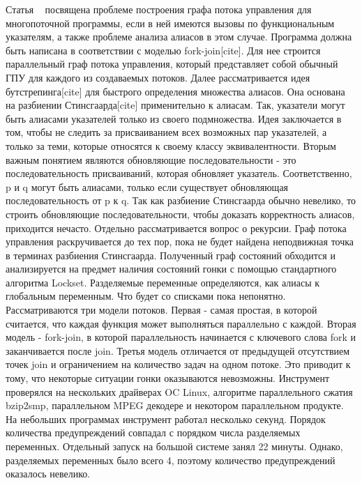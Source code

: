Статья ~\cite{Kahlon:2009:SDR} посвящена проблеме построения графа потока управления для многопоточной программы, если в ней имеются вызовы по функциональным указателям, а также проблеме анализа алиасов в этом случае. Программа должна быть написана в соответствии с моделью fork-join[cite]. Для нее строится параллельный граф потока управления, который представляет собой обычный ГПУ для каждого из создаваемых потоков. 
Далее рассматривается идея бутстрепинга[cite] для быстрого определения множества алиасов. Она основана на разбиении Стинсгаарда[cite] применительно к алиасам. Так, указатели могут быть алиасами указателей только из своего подмножества. Идея заключается в том, чтобы не следить за присваиванием всех возможных пар указателей, а только за теми, которые относятся к своему классу эквивалентности. Вторым важным понятием являются обновляющие последовательности - это последовательность присваиваний, которая обновляет указатель. Соответственно, p и q могут быть алиасами, только если существует обновляющая последовательность от p к q. Так как разбиение Стинсгаарда обычно невелико, то строить обновляющие последовательности, чтобы доказать корректность алиасов, приходится нечасто. 
Отдельно рассматривается вопрос о рекурсии. Граф потока управления раскручивается до тех пор, пока не будет найдена неподвижная точка в терминах разбиения Стинсгаарда. Полученный граф состояний обходится и анализируется на предмет наличия состояний гонки с помощью стандартного алгоритма Lockset. Разделяемые переменные определяются, как алиасы к глобальным переменным. Что будет со списками пока непонятно. Рассматриваются три модели потоков. Первая - самая простая, в которой считается, что каждая функция может выполняться параллельно с каждой. Вторая модель - fork-join, в которой параллельность начинается с ключевого слова fork и заканчивается после join. Третья модель отличается от предыдущей отсутствием точек join и ограничением на количество задач на одном потоке. Это приводит к тому, что некоторые ситуации гонки оказываются невозможны. Инструмент проверялся на нескольких драйверах OC Linux,  алгоритме параллельного сжатия bzip2smp, параллельном MPEG декодере и некотором параллельном продукте. На небольших программах инструмент работал несколько секунд. Порядок количества предупреждений совпадал с порядком числа разделяемых переменных. Отдельный запуск на большой системе занял 22 минуты. Однако, разделяемых переменных было всего 4, поэтому количество предупреждений оказалось невелико. 

